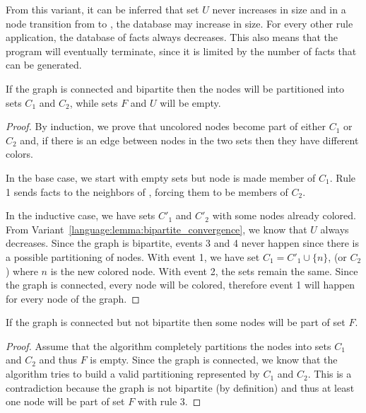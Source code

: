 From this variant, it can be inferred that set $U$ never increases in size
and in a node transition from  to , the
database may increase in size. For every other rule application, the database of
facts always decreases. This also means that the program will eventually
terminate, since it is limited by the number of  facts that can be
generated.

\begin{theorem}

If the graph is connected and bipartite then the nodes will be partitioned into sets
$C_{1}$ and $C_{2}$, while sets $F$ and $U$ will be empty.

\end{theorem}
\begin{proof}
   By induction, we prove that uncolored nodes become part of either $C_{1}$
   or $C_{2}$ and, if there is an edge between nodes in the two sets then
   they have different colors.

   In the base case, we start with empty sets but node  is made
   member of $C_{1}$. Rule 1 sends  facts to the neighbors of
   , forcing them to be members of $C_{2}$.

   In the inductive case, we have sets $C'_{1}$ and $C'_{2}$ with some nodes
   already colored. From Variant~\ref{language:lemma:bipartite_convergence}, we
   know that $U$ always decreases. Since the graph is bipartite, events 3 and 4
   never happen since there is a possible partitioning of nodes. With event 1,
   we have set $C_{1} = C'_{1} \cup \{n\}$, (or $C_{2}$) where $n$ is the new
   colored node. With event 2, the sets remain the same. Since the graph is
   connected, every node will be colored, therefore event 1 will happen for
   every node of the graph.

\end{proof}

\begin{theorem}
If the graph is connected but not bipartite then some nodes will be part of set
$F$.
\end{theorem}
\begin{proof}

Assume that the algorithm completely partitions the nodes into sets $C_{1}$ and
$C_{2}$ and thus $F$ is empty. Since the graph is connected, we know that the
algorithm tries to build a valid partitioning represented by $C_{1}$ and
$C_{2}$.  This is a contradiction because the graph is not bipartite (by
definition) and thus at least one node will be part of set $F$ with rule 3.

\end{proof}

